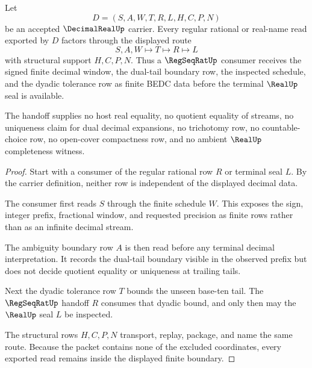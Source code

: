 \begin{theorem}
\label{thm:decimal-real-regseqrat-handoff}
Let
$$
D=(S,A,W,T,R,L,H,C,P,N)
$$
be an accepted $\DecimalRealUp$ carrier. Every regular rational or real-name read exported by $D$ factors through the displayed route
$$
S,A,W \longmapsto T \longmapsto R \longmapsto L
$$
with structural support $H,C,P,N$. Thus a $\RegSeqRatUp$ consumer receives the signed finite decimal window, the dual-tail boundary row, the inspected schedule, and the dyadic tolerance row as finite BEDC data before the terminal $\RealUp$ seal is available.

The handoff supplies no host real equality, no quotient equality of streams, no uniqueness claim for dual decimal expansions, no trichotomy row, no countable-choice row, no open-cover compactness row, and no ambient $\RealUp$ completeness witness.
\end{theorem}
\begin{proof}
Start with a consumer of the regular rational row $R$ or terminal seal $L$. By the carrier definition, neither row is independent of the displayed decimal data.

The consumer first reads $S$ through the finite schedule $W$. This exposes the sign, integer prefix, fractional window, and requested precision as finite rows rather than as an infinite decimal stream.

The ambiguity boundary row $A$ is then read before any terminal decimal interpretation. It records the dual-tail boundary visible in the observed prefix but does not decide quotient equality or uniqueness at trailing tails.

Next the dyadic tolerance row $T$ bounds the unseen base-ten tail. The $\RegSeqRatUp$ handoff $R$ consumes that dyadic bound, and only then may the $\RealUp$ seal $L$ be inspected.

The structural rows $H,C,P,N$ transport, replay, package, and name the same route. Because the packet contains none of the excluded coordinates, every exported read remains inside the displayed finite boundary.
\end{proof}


